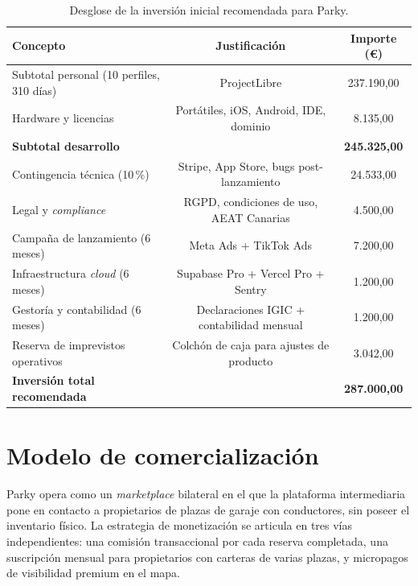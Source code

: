 \begin{table}[H]
    \centering
    \renewcommand{\arraystretch}{1.2}
    \begin{tabular}{lcc}
        \toprule
        \textbf{Concepto}                         & \textbf{Justificación}                   & \textbf{Importe (€)} \\
        \midrule
        Subtotal personal (10 perfiles, 310 días) & ProjectLibre                             & 237.190,00           \\ Hardware y licencias                      & Portátiles, iOS, Android, IDE, dominio    & 8.135,00             \\
        \midrule
        \textbf{Subtotal desarrollo}              &                                          & \textbf{245.325,00}  \\
        \midrule
        Contingencia técnica (10\,\%)             & Stripe, App Store, bugs post-lanzamiento & 24.533,00            \\ Legal y \textit{compliance}               & RGPD, condiciones de uso, AEAT Canarias   & 4.500,00             \\ Campaña de lanzamiento (6 meses)          & Meta Ads + TikTok Ads       & 7.200,00             \\ Infraestructura \textit{cloud} (6 meses)  & Supabase Pro + Vercel Pro + Sentry        & 1.200,00             \\ Gestoría y contabilidad (6 meses)         & Declaraciones IGIC + contabilidad mensual & 1.200,00             \\ Reserva de imprevistos operativos         & Colchón de caja para ajustes de producto  & 3.042,00             \\
        \midrule
        \textbf{Inversión total recomendada}      &                                          & \textbf{287.000,00}  \\
        \bottomrule
    \end{tabular}
    \caption{Desglose de la inversión inicial recomendada para Parky.}
    \label{tab:inversion_total}
\end{table}

\section{Modelo de comercialización}
\label{sec:modelo_comercializacion}

Parky opera como un \textit{marketplace} bilateral en el que la plataforma intermediaria pone en contacto a propietarios de plazas de garaje con conductores, sin poseer el inventario físico. La estrategia de monetización se articula en tres vías independientes: una comisión transaccional por cada reserva completada, una suscripción mensual para propietarios con carteras de varias plazas, y micropagos de visibilidad premium en el mapa.

